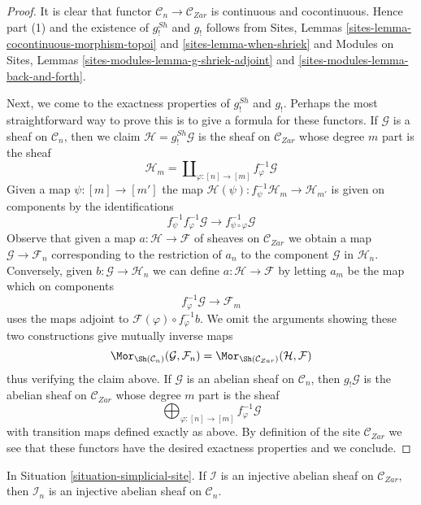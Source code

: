 \begin{proof}
It is clear that functor $\mathcal{C}_n \to \mathcal{C}_{Zar}$ is
continuous and cocontinuous. Hence part (1) and the existence
of $g^{Sh}_!$ and $g_!$ follows from
Sites, Lemmas \ref{sites-lemma-cocontinuous-morphism-topoi} and
\ref{sites-lemma-when-shriek}
and
Modules on Sites, Lemmas \ref{sites-modules-lemma-g-shriek-adjoint} and
\ref{sites-modules-lemma-back-and-forth}.

\medskip\noindent
Next, we come to the exactness properties of $g^{Sh}_!$ and $g_!$.
Perhaps the most straightforward way to prove this is to give a formula
for these functors. If $\mathcal{G}$ is a sheaf on $\mathcal{C}_n$,
then we claim $\mathcal{H} = g^{Sh}_!\mathcal{G}$ is the sheaf on
$\mathcal{C}_{Zar}$ whose degree $m$ part is the sheaf
$$
\mathcal{H}_m = \coprod\nolimits_{\varphi : [n] \to [m]}
f_\varphi^{-1}\mathcal{G}
$$
Given a map $\psi : [m] \to [m']$ the map
$\mathcal{H}(\psi) : f_\psi^{-1}\mathcal{H}_m \to \mathcal{H}_{m'}$
is given on components by the identifications
$$
f_\psi^{-1} f_\varphi^{-1} \mathcal{G} \to
f_{\psi \circ \varphi}^{-1}\mathcal{G}
$$
Observe that given a map $a : \mathcal{H} \to \mathcal{F}$ of sheaves on
$\mathcal{C}_{Zar}$ we obtain a map $\mathcal{G} \to \mathcal{F}_n$
corresponding to the restriction of $a_n$ to the component
$\mathcal{G}$ in $\mathcal{H}_n$. Conversely, given
$b : \mathcal{G} \to \mathcal{H}_n$ we can define
$a : \mathcal{H} \to \mathcal{F}$ by letting $a_m$ be the map which
on components
$$
f_\varphi^{-1}\mathcal{G} \to \mathcal{F}_m
$$
uses the maps adjoint to $\mathcal{F}(\varphi) \circ f_\varphi^{-1}b$.
We omit the arguments showing these two constructions give
mutually inverse maps
$$
\Mor_{\Sh(\mathcal{C}_n)}(\mathcal{G}, \mathcal{F}_n) =
\Mor_{\Sh(\mathcal{C}_{Zar})}(\mathcal{H}, \mathcal{F})
$$
thus verifying the claim above.
If $\mathcal{G}$ is an abelian sheaf on $\mathcal{C}_n$,
then $g_!\mathcal{G}$ is the abelian sheaf on $\mathcal{C}_{Zar}$
whose degree $m$ part is the sheaf
$$
\bigoplus\nolimits_{\varphi : [n] \to [m]} f_\varphi^{-1}\mathcal{G}
$$
with transition maps defined exactly as above. By definition of the
site $\mathcal{C}_{Zar}$ we see that these functors have the desired
exactness properties and we conclude.
\end{proof}

\begin{lemma}
\label{lemma-restriction-injective-to-component-site}
In Situation \ref{situation-simplicial-site}. If $\mathcal{I}$ is an
injective abelian sheaf on $\mathcal{C}_{Zar}$, then $\mathcal{I}_n$ is an
injective abelian sheaf on $\mathcal{C}_n$.
\end{lemma}

